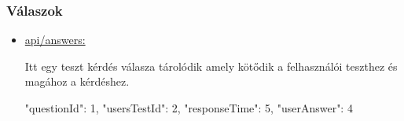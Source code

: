 \subsubsection{Válaszok}
\begin{itemize}[label={$\bullet$}, topsep=0pt, itemsep=0pt, leftmargin=15pt]
    \item[] {\url{api/answers:}}
          \begin{addmargin}[\parindent]{0pt}
              Itt egy teszt kérdés válasza tárolódik amely kötődik a felhasználói teszthez és magához a kérdéshez.

              \begin{json}
{
    "questionId": 1,
    "usersTestId": 2,
    "responseTime": 5,
    "userAnswer": 4
}
              \end{json}
          \end{addmargin}
\end{itemize}

